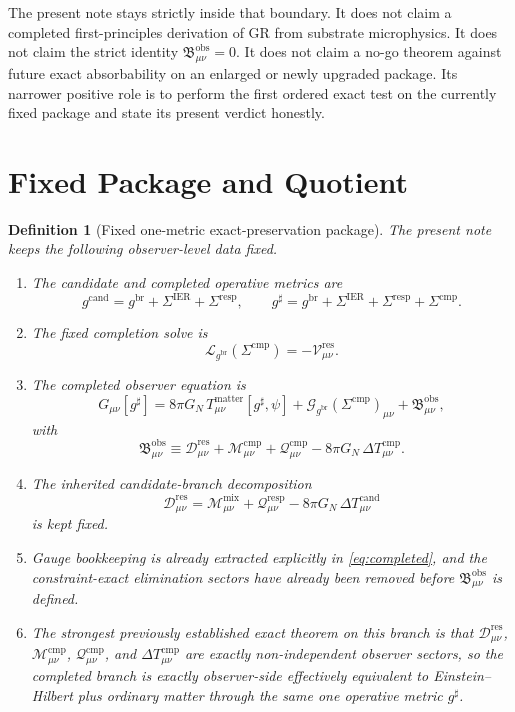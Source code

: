 \documentclass[11pt]{article}
\newcommand{\ObserverMetric}{g^{\mathrm{br}}}
\newcommand{\CandidateMetric}{g^{\mathrm{cand}}}
\newcommand{\CompletedMetric}{g^{\sharp}}
\newcommand{\BaseShift}{\Sigma^{\mathrm{IER}}}
\newcommand{\ResponseShift}{\Sigma^{\mathrm{resp}}}
\newcommand{\CompShift}{\Sigma^{\mathrm{cmp}}}
\newcommand{\ResidualCore}{\mathcal V_{\mu\nu}^{\mathrm{res}}}
\newcommand{\ResidualDec}{\mathcal D_{\mu\nu}^{\mathrm{res}}}
\newcommand{\MixQuad}{\mathcal M_{\mu\nu}^{\mathrm{mix}}}
\newcommand{\RespQuad}{\mathcal Q_{\mu\nu}^{\mathrm{resp}}}
\newcommand{\DeltaTCand}{\Delta T_{\mu\nu}^{\mathrm{cand}}}
\newcommand{\ReducedEin}{\mathcal L_{\ObserverMetric}}
\newcommand{\GaugeBook}{\mathcal G_{\ObserverMetric}}
\newcommand{\CompMix}{\mathcal M_{\mu\nu}^{\mathrm{cmp}}}
\newcommand{\CompQuad}{\mathcal Q_{\mu\nu}^{\mathrm{cmp}}}
\newcommand{\DeltaTComp}{\Delta T_{\mu\nu}^{\mathrm{cmp}}}
\newcommand{\ObsBurden}{\mathfrak B_{\mu\nu}^{\mathrm{obs}}}
\newtheorem{definition}{Definition}
\begin{document}
The present note stays strictly inside that boundary. It does not claim a completed first-principles derivation of GR from substrate microphysics. It does not claim the strict identity \(\ObsBurden=0\). It does not claim a no-go theorem against future exact absorbability on an enlarged or newly upgraded package. Its narrower positive role is to perform the first ordered exact test on the currently fixed package and state its present verdict honestly.

\section{Fixed Package and Quotient}

\begin{definition}[Fixed one-metric exact-preservation package]
\label{def:fixed}
The present note keeps the following observer-level data fixed.
\begin{enumerate}
    \item The candidate and completed operative metrics are
    \begin{equation}
    \CandidateMetric
    =
    \ObserverMetric+\BaseShift+\ResponseShift,
    \qquad
    \CompletedMetric
    =
    \ObserverMetric+\BaseShift+\ResponseShift+\CompShift.
    \label{eq:metrics}
    \end{equation}
    \item The fixed completion solve is
    \begin{equation}
    \ReducedEin(\CompShift)=-\ResidualCore.
    \label{eq:solve}
    \end{equation}
    \item The completed observer equation is
    \begin{equation}
    G_{\mu\nu}[\CompletedMetric]
    =
    8\pi G_N\,T_{\mu\nu}^{\mathrm{matter}}[\CompletedMetric,\psi]
    +\GaugeBook(\CompShift)_{\mu\nu}
    +\ObsBurden,
    \label{eq:completed}
    \end{equation}
    with
    \begin{equation}
    \ObsBurden
    \equiv
    \ResidualDec+\CompMix+\CompQuad-8\pi G_N\,\DeltaTComp.
    \label{eq:burden}
    \end{equation}
    \item The inherited candidate-branch decomposition
    \begin{equation}
    \ResidualDec
    =
    \MixQuad+\RespQuad-8\pi G_N\,\DeltaTCand
    \label{eq:resdec}
    \end{equation}
    is kept fixed.
    \item Gauge bookkeeping is already extracted explicitly in \eqref{eq:completed}, and the constraint-exact elimination sectors have already been removed before \(\ObsBurden\) is defined.
    \item The strongest previously established exact theorem on this branch is that \(\ResidualDec\), \(\CompMix\), \(\CompQuad\), and \(\DeltaTComp\) are exactly non-independent observer sectors, so the completed branch is exactly observer-side effectively equivalent to Einstein--Hilbert plus ordinary matter through the same one operative metric \(\CompletedMetric\).
\end{enumerate}
\end{definition}
\end{document}
